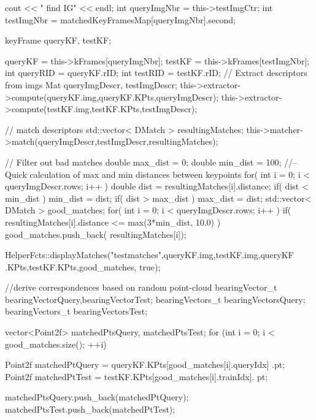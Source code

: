 \begin{DoxyCode}
                                           {

        cout << "               find IG" << endl;
        int queryImgNbr = this->testImgCtr;
        int testImgNbr = matchedKeyFramesMap[queryImgNbr].second;

        keyFrame queryKF, testKF;

        queryKF = this->kFrames[queryImgNbr];
        testKF = this->kFrames[testImgNbr];
        int queryRID = queryKF.rID;
        int testRID = testKF.rID;
        // Extract descriptors from imgs
        Mat queryImgDescr, testImgDescr;
        this->extractor->compute(queryKF.img,queryKF.KPts,queryImgDescr);
        this->extractor->compute(testKF.img,testKF.KPts,testImgDescr);

        // match descriptors
        std::vector< DMatch > resultingMatches;
        this->matcher->match(queryImgDescr,testImgDescr,resultingMatches);

        // Filter out bad matches
        double max_dist = 0; double min_dist = 100;
        //-- Quick calculation of max and min distances between keypoints
        for( int i = 0; i < queryImgDescr.rows; i++ ) {
                double dist = resultingMatches[i].distance;
                if( dist < min_dist ) min_dist = dist;
                if( dist > max_dist ) max_dist = dist;
        }
        std::vector< DMatch > good_matches;
        for( int i = 0; i < queryImgDescr.rows; i++ ) {
                if( resultingMatches[i].distance <= max(3*min_dist, 10.0) ) {
                        good_matches.push_back( resultingMatches[i]);
                }
        }


        HelperFcts::displayMatches("testmatches",queryKF.img,testKF.img,queryKF
      .KPts,testKF.KPts,good_matches, true);

        //derive correspondences based on random point-cloud
        bearingVector_t bearingVectorQuery,bearingVectorTest;
        bearingVectors_t bearingVectorsQuery;
        bearingVectors_t bearingVectorsTest;

        vector<Point2f> matchedPtsQuery, matchedPtsTest;
        for (int i = 0; i < good_matches.size(); ++i)
        {
                Point2f matchedPtQuery = queryKF.KPts[good_matches[i].queryIdx]
      .pt;
                Point2f matchedPtTest = testKF.KPts[good_matches[i].trainIdx].
      pt;

                matchedPtsQuery.push_back(matchedPtQuery);
                matchedPtsTest.push_back(matchedPtTest);

}}
\end{DoxyCode}
